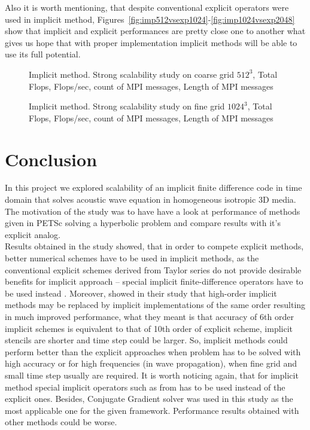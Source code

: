 \documentclass[12pt,a4paper]{report}
\begin{document}
 Also it is worth mentioning, that despite conventional explicit operators were used in implicit method, Figures~\ref{fig:imp512vsexp1024}-\ref{fig:imp1024vsexp2048} show that implicit and explicit performances are pretty close one to another what gives us hope that with proper implementation implicit methods will be able to use its full potential.

\begin{figure}[h!]
\caption{Implicit method. Strong scalability study on coarse grid $512^3$, Total Flops, Flops/sec, count of MPI messages, Length of MPI messages}
\label{fig:imp512strong}
\end{figure}

\begin{figure}[h!]
\caption{Implicit method. Strong scalability study on fine grid $1024^3$, Total Flops, Flops/sec, count of MPI messages, Length of MPI messages}
\label{fig:imp1024strong}
\end{figure}

\section*{Conclusion}

In this project we explored scalability of an implicit finite difference code in time domain that solves acoustic wave equation in homogeneous isotropic 3D media. The motivation of the study was to have have a look at performance of methods given in PETSc solving a hyperbolic problem and compare results with it's explicit analog.\\

Results obtained in the study showed, that in order to compete explicit methods, better numerical schemes have to be used in implicit methods, as the conventional explicit schemes derived from Taylor series do not provide desirable benefits for implicit approach -- special implicit finite-difference operators have to be used instead \citep{chu2010frequency}. Moreover, \cite{chu2012implicit} showed in their study that high-order implicit methods may be replaced by implicit implementations of the same order resulting in much improved performance, what they meant is that accuracy of 6th order implicit schemes is equivalent to that of 10th order of explicit scheme, implicit stencils are shorter and time step could be larger. So, implicit methods could perform better than the explicit approaches when problem has to be solved with high accuracy or for high frequencies (in wave propagation), when fine grid and small time step usually are required. It is worth noticing again, that for implicit method special implicit operators such as from \cite{chu2012implicit} has to be used instead of the explicit ones. Besides, Conjugate Gradient solver was used in this study as the most applicable one for the given framework. Performance results obtained with other methods could be worse.\\
\end{document}
